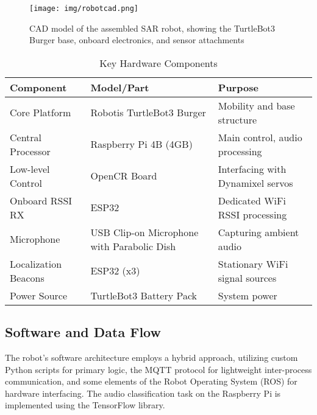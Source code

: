 \begin{figure}[!b]
  \centering
  \texttt{[image: img/robotcad.png]}
  \caption{CAD model of the assembled SAR robot, showing the TurtleBot3 Burger base, onboard electronics, and sensor attachments}
  \label{fig:robotCAD}
\end{figure}

\begin{table*}[t]
  \caption{Key Hardware Components}
  \label{tab:hardware_components}
  \centering
  \begin{tabular}{lll}
    \toprule
    \textbf{Component} & \textbf{Model/Part} & \textbf{Purpose} \\
    \midrule
    Core Platform & Robotis TurtleBot3 Burger & Mobility and base structure \\
    Central Processor & Raspberry Pi 4B (4GB) & Main control, audio processing \\
    Low-level Control & OpenCR Board & Interfacing with Dynamixel servos \\
    Onboard RSSI RX & ESP32 & Dedicated WiFi RSSI processing \\
    Microphone & USB Clip-on Microphone with Parabolic Dish & Capturing ambient audio \\
    Localization Beacons & ESP32 (x3) & Stationary WiFi signal sources \\
    Power Source & TurtleBot3 Battery Pack & System power \\
    \bottomrule
  \end{tabular}
\end{table*}

\subsection{Software and Data Flow}
The robot's software architecture employs a hybrid approach, utilizing custom Python scripts for primary logic, the MQTT protocol for lightweight inter-process communication, and some elements of the Robot Operating System (ROS) for hardware interfacing. The audio classification task on the Raspberry Pi is implemented using the TensorFlow library.

